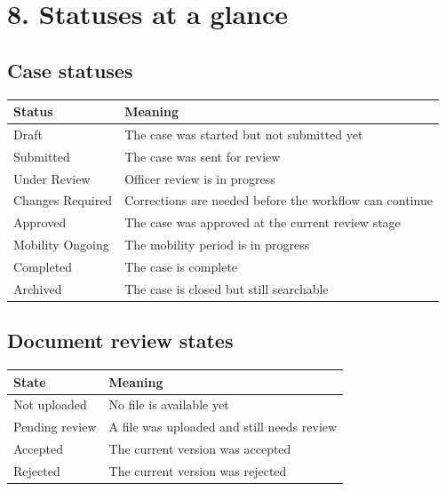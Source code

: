 \documentclass[11pt,a4paper]{article}
\begin{document}
\section*{8. Statuses at a glance}
\subsection*{Case statuses}
\begin{longtable}{>{\raggedright\arraybackslash}p{4cm} >{\raggedright\arraybackslash}p{9.3cm}}
\rowcolor{swusurface}\textbf{Status} & \textbf{Meaning} \\
\midrule
Draft & The case was started but not submitted yet \\
Submitted & The case was sent for review \\
Under Review & Officer review is in progress \\
Changes Required & Corrections are needed before the workflow can continue \\
Approved & The case was approved at the current review stage \\
Mobility Ongoing & The mobility period is in progress \\
Completed & The case is complete \\
Archived & The case is closed but still searchable \\
\end{longtable}

\subsection*{Document review states}
\begin{longtable}{>{\raggedright\arraybackslash}p{4cm} >{\raggedright\arraybackslash}p{9.3cm}}
\rowcolor{swusurface}\textbf{State} & \textbf{Meaning} \\
\midrule
Not uploaded & No file is available yet \\
Pending review & A file was uploaded and still needs review \\
Accepted & The current version was accepted \\
Rejected & The current version was rejected \\
\end{longtable}
\end{document}
